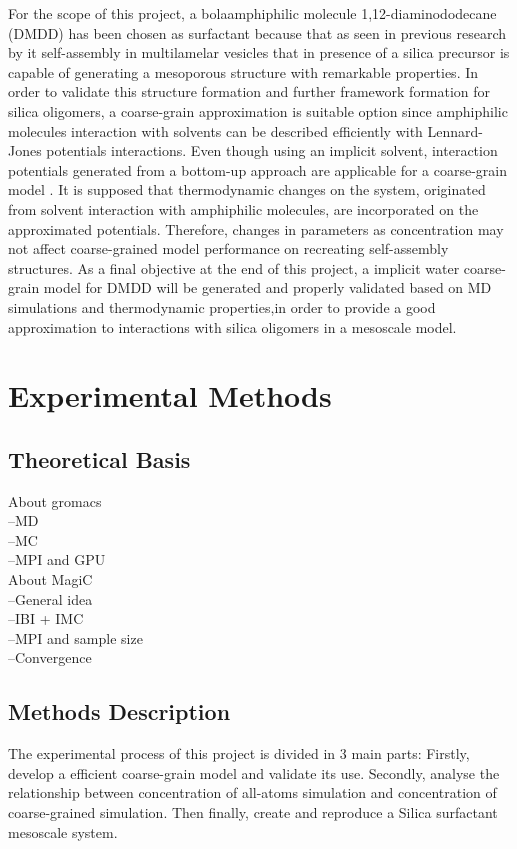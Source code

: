 \documentclass[10pt,a4paper,twoside]{article}
\begin{document}
For the scope of this project, a bolaamphiphilic molecule 1,12-diaminododecane (DMDD) has been chosen as surfactant because that as seen in previous research by  it self-assembly in multilamelar vesicles that in presence of a silica precursor is capable of generating a mesoporous structure with remarkable properties. In order to validate this structure formation and further framework formation for silica oligomers, a coarse-grain approximation is suitable option since amphiphilic molecules interaction with solvents can be described efficiently with Lennard-Jones potentials interactions. Even though using an implicit solvent, interaction potentials generated from a bottom-up approach are applicable for a coarse-grain model \cite{dmpc}. It is supposed  that thermodynamic changes on the system, originated from solvent interaction with amphiphilic molecules, are incorporated on the approximated potentials. Therefore, changes in parameters as concentration may not affect coarse-grained model performance on recreating self-assembly structures.  As a final objective at the end of this project, a implicit water coarse-grain model for DMDD will be generated and properly validated based on MD simulations and thermodynamic properties,in order to provide a good approximation to interactions with silica oligomers in a mesoscale model. 
\section{Experimental Methods}
\subsection{Theoretical Basis}
About gromacs\\
 --MD\\
 --MC\\
 --MPI and GPU\\
About MagiC\\
 --General idea\\
 --IBI + IMC\\
 --MPI and sample size\\
 --Convergence\\
 
\subsection{Methods Description} 
The experimental process of this project is divided in 3 main parts: Firstly, develop a efficient coarse-grain model and validate its use. Secondly, analyse the relationship between concentration  of all-atoms simulation and concentration of coarse-grained simulation. Then finally, create and reproduce a Silica surfactant mesoscale system. 
\end{document}
